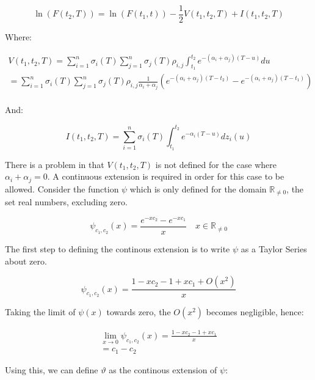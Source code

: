 \documentclass{article}
\begin{document}
\begin{equation}
    \ln(F(t_2, T)) = \ln(F(t_1, t)) - \frac{1}{2} V(t_1, t_2, T) + I(t_1, t_2, T)
\end{equation}

Where:

\begin{eqnarray}
    \label{eq:forward_drift_adjust}
    \nonumber
    V(t_1, t_2, T) =  \sum_{i=1}^n \sigma_i(T) \sum_{j=1}^n 
    \sigma_j(T) \rho_{i,j} \int_{t_1}^{t_2} e^{-(\alpha_i + \alpha_j)(T-u)} du\\
    = \sum_{i=1}^n \sigma_i(T) \sum_{j=1}^n \sigma_j(T) \rho_{i,j} 
    \frac{1}{\alpha_i + \alpha_j} (e^{-(\alpha_i + \alpha_j)(T-t_2)} - 
    e^{-(\alpha_i + \alpha_j)(T-t_1)}) \\
    \nonumber
\end{eqnarray}

And:

\begin{equation}
    I(t_1, t_2, T) = \sum_{i=1}^n \sigma_i(T) \int_{t_1}^{t_2} e^{-\alpha_i(T-u)}dz_i(u)
\end{equation}

\bigskip
There is a problem in that $V(t_1, t_2, T)$ is not defined for the case where 
$\alpha_i + \alpha_j = 0$. A continuous extension is required in order for this
case to be allowed. Consider the function $\psi$ which is only defined for 
the domain $\mathbb{R}_{\ne 0}$, the set real numbers, excluding zero.

\begin{equation}
    \psi_{c_1, c_2}(x) = \frac{e^{-x c_2} - e^{-x c_1}}{x} \quad  x \in \mathbb{R}_{\ne 0}
\end{equation}

The first step to defining the continous extension is to write $\psi$ as a Taylor Series
about zero.

\begin{equation}
    \psi_{c_1, c_2}(x) = \frac{1 - x c_2 - 1 + x c_1 + O(x^2)}{x}
\end{equation}

Taking the limit of $\psi(x)$ towards zero, the $O(x^2)$ becomes negligible, hence:

\begin{eqnarray}
    \nonumber
    \lim_{x \to 0} \psi_{c_1, c_2}(x) = \frac{1 - x c_2 - 1 + x c_1}{x} \\
    = c_1 - c_2
\end{eqnarray}

Using this, we can define $\vartheta$ as the continous extension of $\psi$:
\end{document}
